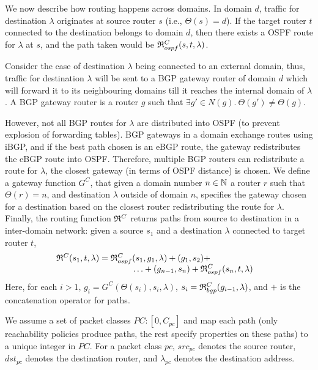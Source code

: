  We now describe how routing
happens across domains.  In domain $d$, traffic 
for destination $\lambda$ originates at source
router $s$ (i.e., $\Theta(s) = d$). 
If the target router $t$ connected to the
destination belongs to domain $d$, then there exists a OSPF route for
$\lambda$ at $s$, and the path taken would be
$\mathfrak{R}_{ospf}^C(s,t,\lambda)$.

Consider the case of destination $\lambda$ being connected 
to an external domain, thus, traffic for destination $\lambda$
will be sent to a BGP gateway router of domain $d$ which 
will forward it to its neighbouring domains till
it reaches the internal domain of $\lambda$. A BGP gateway
router is a router $g$ such that $\exists g' \in N(g). 
~\Theta(g') \not= \Theta(g)$. 

However, not all BGP routes for $\lambda$
are distributed 
into OSPF (to prevent explosion of forwarding tables). 
BGP gateways in a domain exchange routes using iBGP,
and if the best path chosen is an eBGP route, 
the gateway redistributes the eBGP route into OSPF. 
Therefore, multiple BGP routers
can redistribute a route for $\lambda$,  
the closest gateway (in terms of OSPF distance)
is chosen. We define a gateway function $G^C$,
that given a domain number $n\in \mathbb{N}$
a router $r$ such that $\Theta(r)=n$,
and destination $\lambda$ outside of domain $n$, 
specifies the
gateway chosen for a destination based on the
closest router redistributing the route for $\lambda$. 
Finally, the routing function 
$\mathfrak{R}^C$
returns paths from source to destination in a inter-domain network:
given a source $s_1$ and a destination $\lambda$ connected to target router $t$, 
\[
\begin{array}{c}
	\mathfrak{R}^C(s_1, t, \lambda) = 
	\mathfrak{R}_{ospf}^C(s_1,g_1, \lambda) + 
	 (g_1, s_2 )+\qquad\qquad\qquad  \\
	\qquad\qquad\qquad\qquad \ldots  + (g_{n-1}, s_n) +\mathfrak{R}_{ospf}^C(s_n,t,\lambda)
\end{array}
\]
Here, for each $i>1$, $g_i=G^C(\Theta(s_i),s_i,\lambda)$, 
$s_i=\mathfrak{R}_{bgp}^C(g_{i-1}, \lambda)$,
and  $+$ is the concatenation operator for paths. 

We assume a set of packet classes $PC : [0,C_{pc}]$ 
and map each path (only reachability policies produce paths,
the rest specify properties on these paths)
to a unique integer in $PC$.
For a packet class $pc$, $src_{pc}$ denotes the source router,
$dst_{pc}$ denotes the destination router, and $\lambda_{pc}$
denotes the destination   address. 


